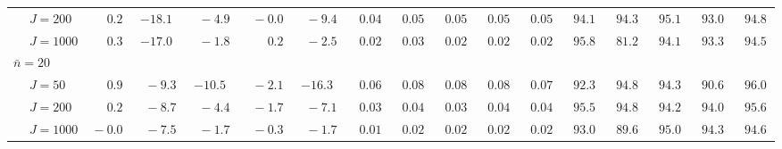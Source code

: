 \begin{sidewaystable}
\begin{threeparttable}
\begin{tabular}{llccccccccccccccc}
 & \nopagebreak $\;J=200$  & $\phantom{0}\phantom{-}0.2\phantom{0}$ & ${-}18.1\phantom{0}$ & $\phantom{0}{-}4.9\phantom{0}$ & $\phantom{0}{-}0.0\phantom{0}$ & $\phantom{0}{-}9.4\phantom{0}$ & $\phantom{0}0.04\phantom{0}$ & $\phantom{0}0.05\phantom{0}$ & $\phantom{0}0.05\phantom{0}$ & $\phantom{0}0.05\phantom{0}$ & $\phantom{0}0.05\phantom{0}$ & $\phantom{0}94.1\phantom{0}$ & $\phantom{0}94.3\phantom{0}$ & $\phantom{0}95.1\phantom{0}$ & $\phantom{0}93.0\phantom{0}$ & $\phantom{0}94.8\phantom{0}$ \\
 & \nopagebreak $\;J=1000$  & $\phantom{0}\phantom{-}0.3\phantom{0}$ & ${-}17.0\phantom{0}$ & $\phantom{0}{-}1.8\phantom{0}$ & $\phantom{0}\phantom{-}0.2\phantom{0}$ & $\phantom{0}{-}2.5\phantom{0}$ & $\phantom{0}0.02\phantom{0}$ & $\phantom{0}0.03\phantom{0}$ & $\phantom{0}0.02\phantom{0}$ & $\phantom{0}0.02\phantom{0}$ & $\phantom{0}0.02\phantom{0}$ & $\phantom{0}95.8\phantom{0}$ & $\phantom{0}81.2\phantom{0}$ & $\phantom{0}94.1\phantom{0}$ & $\phantom{0}93.3\phantom{0}$ & $\phantom{0}94.5\phantom{0}$ \\
\multicolumn{4}{l}{$\bar{n}=20$} \\  & \nopagebreak $\;J=50$  & $\phantom{0}\phantom{-}0.9\phantom{0}$ & $\phantom{0}{-}9.3\phantom{0}$ & ${-}10.5\phantom{0}$ & $\phantom{0}{-}2.1\phantom{0}$ & ${-}16.3\phantom{0}$ & $\phantom{0}0.06\phantom{0}$ & $\phantom{0}0.08\phantom{0}$ & $\phantom{0}0.08\phantom{0}$ & $\phantom{0}0.08\phantom{0}$ & $\phantom{0}0.07\phantom{0}$ & $\phantom{0}92.3\phantom{0}$ & $\phantom{0}94.8\phantom{0}$ & $\phantom{0}94.3\phantom{0}$ & $\phantom{0}90.6\phantom{0}$ & $\phantom{0}96.0\phantom{0}$ \\
 & \nopagebreak $\;J=200$  & $\phantom{0}\phantom{-}0.2\phantom{0}$ & $\phantom{0}{-}8.7\phantom{0}$ & $\phantom{0}{-}4.4\phantom{0}$ & $\phantom{0}{-}1.7\phantom{0}$ & $\phantom{0}{-}7.1\phantom{0}$ & $\phantom{0}0.03\phantom{0}$ & $\phantom{0}0.04\phantom{0}$ & $\phantom{0}0.03\phantom{0}$ & $\phantom{0}0.04\phantom{0}$ & $\phantom{0}0.04\phantom{0}$ & $\phantom{0}95.5\phantom{0}$ & $\phantom{0}94.8\phantom{0}$ & $\phantom{0}94.2\phantom{0}$ & $\phantom{0}94.0\phantom{0}$ & $\phantom{0}95.6\phantom{0}$ \\
 & \nopagebreak $\;J=1000$  & $\phantom{0}{-}0.0\phantom{0}$ & $\phantom{0}{-}7.5\phantom{0}$ & $\phantom{0}{-}1.7\phantom{0}$ & $\phantom{0}{-}0.3\phantom{0}$ & $\phantom{0}{-}1.7\phantom{0}$ & $\phantom{0}0.01\phantom{0}$ & $\phantom{0}0.02\phantom{0}$ & $\phantom{0}0.02\phantom{0}$ & $\phantom{0}0.02\phantom{0}$ & $\phantom{0}0.02\phantom{0}$ & $\phantom{0}93.0\phantom{0}$ & $\phantom{0}89.6\phantom{0}$ & $\phantom{0}95.0\phantom{0}$ & $\phantom{0}94.3\phantom{0}$ & $\phantom{0}94.6\phantom{0}$ \\

\end{tabular}
\end{threeparttable}
\end{sidewaystable}

